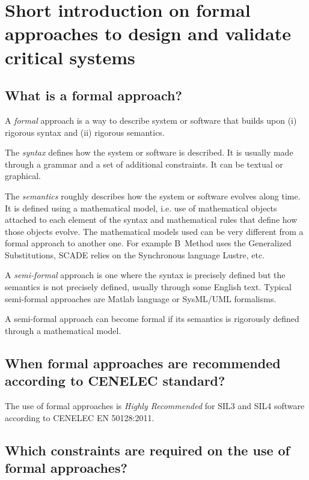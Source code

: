 

\section{Short introduction on formal approaches to  design and validate critical systems}

\subsection{What is a formal approach?}

A \emph{formal} approach is a way to describe system or software
that builds upon (i) rigorous syntax and (ii) rigorous semantics.

The \emph{syntax} defines how the system or software is described. It
is usually made through a grammar and a set of additional
constraints. It can be textual or graphical.

The \emph{semantics} roughly describes how the system or software
evolves along time. It is defined using a mathematical model, i.e. use
of mathematical objects attached to each element of the syntax and
mathematical rules that define how those objects evolve. The
mathematical models used can be very different from a formal approach
to another one. For example B~Method uses the Generalized
Substitutions, SCADE relies on the Synchronous language Lustre, etc.

A \emph{semi-formal} approach is one where the syntax is precisely
defined but the semantics is not precisely defined, usually through
some English text. Typical semi-formal approaches are Matlab language
or SysML/UML formalisms.

A semi-formal approach can become formal if its semantics is
rigorously defined through a mathematical model.

\subsection{When formal approaches are recommended according to CENELEC standard?}

The use of formal approaches is \emph{Highly Recommended} for SIL3 and
SIL4 software according to CENELEC EN 50128:2011.

\subsection{Which constraints are required on the use of formal approaches?}

